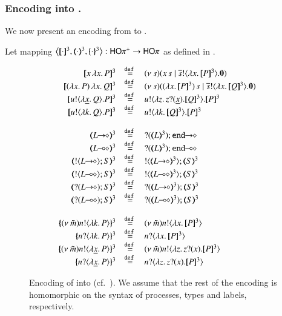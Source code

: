 \subsubsection{Encoding \HOpp into \HOp.}

We now present an encoding from \HOpp to \HOp.
%
\begin{definition}\rm
	\label{def:enc:HOpp_to_HOp}
	Let mapping $\enco{\pmap{\cdot}{3}, \tmap{\cdot}{3}, \mapa{\cdot}^{3}}: \HOpp \to \HOp$
	as defined in .
\end{definition}
%
\begin{figure}[t]
	\[
	\begin{array}{rcl}
		\pmap{\appl{x}{\abs{x} P}}{3} &\defeq& \newsp{s}{\appl{x}{s} \Par \bout{\dual{s}}{\abs{x} \pmap{P}{3}} \inact}
		\\
		\pmap{\appl{(\abs{x} P)}{\abs{x} Q}}{3} &\defeq& \newsp{s}{\appl{(\abs{x} \pmap{P}{3})}{s} \Par \bout{\dual{s}}{\abs{x} \pmap{Q}{3}} \inact}
		\\
		\pmap{\bout{u}{\abs{\underline{x}}{Q}} P}{3} &\defeq& \bout{u}{\abs{z}{\binp{z}{\underline{x}} \pmap{Q}{3}}} \pmap{P}{3}
		\\
		\pmap{\bout{u}{\abs{k}{Q}} P}{3} &\defeq& \bout{u}{\abs{k}{\pmap{Q}{3}}} \pmap{P}{3}
		\\
		\\
		\tmap{\shot{L}}{3} &\defeq& \shot{\btinp{\tmap{L}{3}} \tinact}
		\\
		\tmap{\lhot{L}}{3} &\defeq& \lhot{\btinp{\tmap{L}{3}} \tinact}
		\\
		\tmap{\btout{\shot{L}} S}{3} &\defeq& \btout{\tmap{\shot{L}}{3}} \tmap{S}{3}
		\\
		\tmap{\btout{\lhot{L}} S}{3} &\defeq& \btout{\tmap{\lhot{L}}{3}} \tmap{S}{3}
		\\
		\tmap{\btinp{\shot{L}} S}{3} &\defeq& \btinp{\tmap{\shot{L}}{3}} \tmap{S}{3}
		\\
		\tmap{\btinp{\lhot{L}} S}{3} &\defeq& \btinp{\tmap{\lhot{L}}{3}} \tmap{S}{3}
		\\
		\\
		\mapa{\news{\tilde{m}} \bactout{n}{\abs{k}{P}}}^{3} &\defeq& \news{\tilde{m}} \bactout{n}{\abs{x}{\pmap{P}{3}}}
		\\
		\mapa{\bactinp{n}{\abs{k}{P}}}^{3} &\defeq& \bactinp{n}{\abs{x}{\pmap{P}{3}}}
		\\
		\mapa{\news{\tilde{m}} \bactout{n}{\abs{\underline{x}}{P}}}^{3} &\defeq& \news{\tilde{m}} \bactout{n}{\abs{z}{\binp{z}{x} \pmap{P}{3}}}
		\\
		\mapa{\bactinp{n}{\abs{\underline{x}}{P}}}^{3} &\defeq& \bactinp{n}{\abs{z}{\binp{z}{x} \pmap{P}{3}}}

	\end{array}
	\]
%
	\caption{Encoding of \HOpp into \HOp (cf.~).
	We assume that the rest of the encoding is homomorphic on the syntax of
	processes, types and labels, respectively. \label{fig:enc:HOpp_to_HOp}}
\end{figure}

